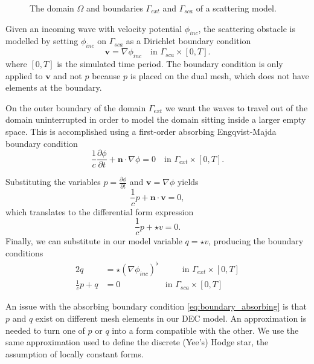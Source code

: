 \documentclass[utf8,english]{gradu3}
\begin{document}
\begin{figure}[h]
  \centering
  \caption{The domain $\Omega$ and boundaries $\Gamma_{ext}$ and $\Gamma_{sca}$
    of a scattering model.}
  \label{fig:scatterer_domain}
\end{figure}

Given an incoming wave with velocity potential $\phi_{inc}$,
the scattering obstacle is modelled by setting $\phi_{inc}$ on $\Gamma_{sca}$
as a Dirichlet boundary condition
\begin{equation}
  \mathbf{v} = \nabla \phi_{inc}
  \quad \text{in } \Gamma_{sca} \times [0, T].
\end{equation}
where $[0,T]$ is the simulated time period.
The boundary condition is only applied to $\mathbf{v}$
and not $p$ because $p$ is placed on the dual mesh,
which does not have elements at the boundary.

On the outer boundary of the domain $\Gamma_{ext}$
we want the waves to travel out of the domain uninterrupted
in order to model the domain sitting inside a larger empty space.
This is accomplished using a first-order absorbing Engqvist-Majda boundary condition
\parencite{engquist_absorbing_1977}
\[
  \frac{1}{c}\frac{\partial\phi}{\partial t} + \mathbf{n} \cdot \nabla\phi = 0
  \quad \text{in } \Gamma_{ext} \times [0, T].
\]

Substituting the variables $p = \frac{\partial \phi}{\partial t}$
and $\mathbf{v} = \nabla \phi$ yields
\[
  \frac{1}{c}p + \mathbf{n} \cdot \mathbf{v} = 0,
\]
which translates to the differential form expression
\[
  \frac{1}{c}p + \star v = 0.
\]
Finally, we can substitute in our model variable $q = \star v$,
producing the boundary conditions
\begin{alignat}{2}
  \label{eq:boundary_dirichlet}
  q &= \star(\nabla \phi_{inc})^{\flat} & \qquad \text{in } \Gamma_{ext} \times [0, T] \\
  \label{eq:boundary_absorbing}
  \frac{1}{c} p + q &= 0 & \text{in } \Gamma_{sca} \times [0, T]
\end{alignat}

An issue with the absorbing boundary condition \eqref{eq:boundary_absorbing}
is that $p$ and $q$ exist on different mesh elements in our DEC model.
An approximation is needed to turn one of $p$ or $q$ into a form compatible with the other.
We use the same approximation used to define the discrete (Yee's) Hodge star,
the assumption of locally constant forms.
\end{document}
